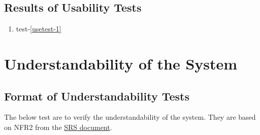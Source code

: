 \documentclass[12pt, titlepage]{article}
\begin{document}
\subsection{Results of Usability Tests}

\begin{enumerate}
  \item test-\ref{usetest-1}
\end{enumerate}

\section{Understandability of the System}

\subsection{Format of Understandability Tests}

The below test are to verify the understandability of the system.
They are based on NFR2 from the \href{https://github.com/gr812b/CVT-Simulator/blob/main/docs/SRS/SRS.pdf}{SRS document}.
\end{document}
